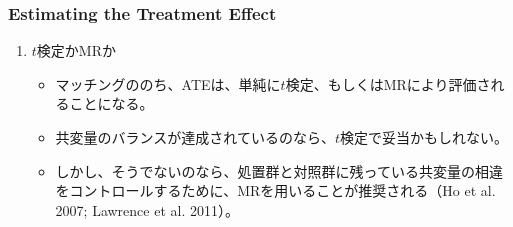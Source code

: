 \subsubsection*{Estimating the Treatment Effect}
\begin{enumerate}
 \item $t$検定かMRか
   \begin{itemize}
    \item マッチングののち、ATEは、単純に$t$検定、もしくはMRにより評価されることになる。
    \item 共変量のバランスが達成されているのなら、$t$検定で妥当かもしれない。
    \item しかし、そうでないのなら、処置群と対照群に残っている共変量の相違をコントロールするために、MRを用いることが推奨される（Ho et al. 2007; Lawrence et al. 2011）。
   \end{itemize}
\end{enumerate}
